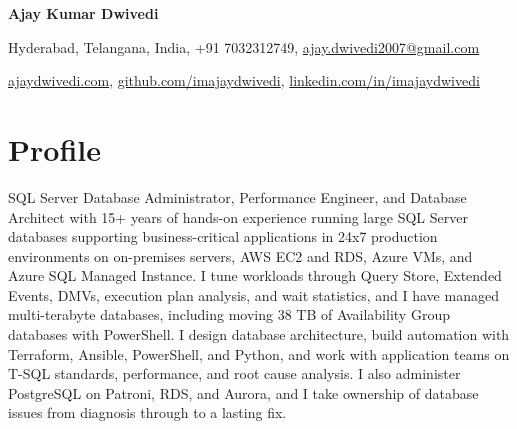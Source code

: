 \documentclass[10pt,a4paper]{article}
\begin{document}
\begin{center}
{\Huge\bfseries Ajay Kumar Dwivedi}

\vspace{6pt}
Hyderabad, Telangana, India, +91 7032312749, \href{mailto:ajay.dwivedi2007@gmail.com}{ajay.dwivedi2007@gmail.com}

\vspace{2pt}
\href{https://ajaydwivedi.com/}{ajaydwivedi.com}, \href{https://github.com/imajaydwivedi}{github.com/imajaydwivedi}, \href{https://linkedin.com/in/imajaydwivedi/}{linkedin.com/in/imajaydwivedi}
\end{center}

\section{Profile}
SQL Server Database Administrator, Performance Engineer, and Database Architect with 15+ years of hands-on experience running large SQL Server databases supporting business-critical applications in 24x7 production environments on on-premises servers, AWS EC2 and RDS, Azure VMs, and Azure SQL Managed Instance. I tune workloads through Query Store, Extended Events, DMVs, execution plan analysis, and wait statistics, and I have managed multi-terabyte databases, including moving 38 TB of Availability Group databases with PowerShell. I design database architecture, build automation with Terraform, Ansible, PowerShell, and Python, and work with application teams on T-SQL standards, performance, and root cause analysis. I also administer PostgreSQL on Patroni, RDS, and Aurora, and I take ownership of database issues from diagnosis through to a lasting fix.
\end{document}
